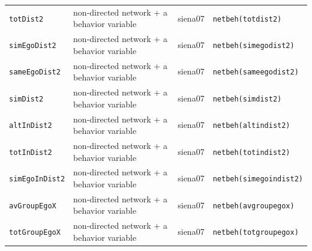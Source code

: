 \begin{longtable}{@{}p{2.6cm}p{3.2cm}p{2.9cm}p{5.4cm}@{}}
\texttt{totDist2} & non-directed network + a behavior variable & siena07 & \texttt{netbeh(totdist2)}\\
\texttt{simEgoDist2} & non-directed network + a behavior variable & siena07 & \texttt{netbeh(simegodist2)}\\
\texttt{sameEgoDist2} & non-directed network + a behavior variable & siena07 & \texttt{netbeh(sameegodist2)}\\
\texttt{simDist2} & non-directed network + a behavior variable & siena07 & \texttt{netbeh(simdist2)}\\
\texttt{altInDist2} & non-directed network + a behavior variable & siena07 & \texttt{netbeh(altindist2)}\\
\texttt{totInDist2} & non-directed network + a behavior variable & siena07 & \texttt{netbeh(totindist2)}\\
\texttt{simEgoInDist2} & non-directed network + a behavior variable & siena07 & \texttt{netbeh(simegoindist2)}\\
\texttt{avGroupEgoX} & non-directed network + a behavior variable & siena07 & \texttt{netbeh(avgroupegox)}\\
\texttt{totGroupEgoX} & non-directed network + a behavior variable & siena07 & \texttt{netbeh(totgroupegox)}\\
\bottomrule
\end{longtable}
\normalsize

